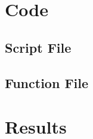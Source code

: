 \section{Code}

\subsection{Script File}


\newpage
\subsection{Function File}


\newpage
\section{Results}

%
%
% 
%
%
% 
%
%
